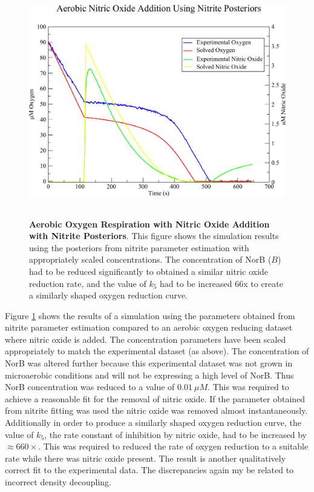\begin{figure}[tbp]
 \centering
 \includegraphics[height=10cm]{./07-nitritereduction/data/no_dataset.pdf}
 \caption[Aerobic Oxygen Respiration with Nitric Oxide Addition with Nitrite Posteriors]{{\bf Aerobic Oxygen Respiration with Nitric Oxide Addition with Nitrite Posteriors}. This figure shows the simulation results using the posteriors from nitrite parameter estimation with appropriately scaled concentrations. The concentration of NorB ($B$) had to be reduced significantly to obtained a similar nitric oxide reduction rate, and the value of $k_5$ had to be increased 66x to create a similarly shaped oxygen reduction curve.
 \label{fig:nitric_oxide_simulation}}
\end{figure}

Figure \ref{fig:nitric_oxide_simulation} shows the results of a simulation using the parameters obtained from nitrite parameter estimation compared to an aerobic oxygen reducing dataset where nitric oxide is added. The concentration parameters have been scaled appropriately to match the experimental dataset (as above). The concentration of NorB was altered further because this experimental dataset was not grown in microaerobic conditions and will not be expressing a high level of NorB. Thus NorB concentration was reduced to a value of $0.01~\mu M$. This was required to achieve a reasonable fit for the removal of nitric oxide. If the parameter obtained from nitrite fitting was used the nitric oxide was removed almost instantaneously. Additionally in order to produce a similarly shaped oxygen reduction curve, the value of $k_5$, the rate constant of \cbbthree{} inhibition by nitric oxide, had to be increased by $\approx 660\times$. This was required to reduced the rate of oxygen reduction to a suitable rate while there was nitric oxide present. The result is another qualitatively correct fit to the experimental data. The discrepancies again my be related to incorrect density decoupling.

